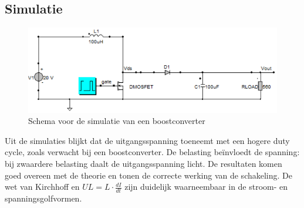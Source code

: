 \subsection{Simulatie}
\begin{figure}[h!]
    \centering
    \includegraphics[width=1\linewidth]{img/hfd1/Schema voor de simulatie van een boostconverter.png}
    \caption{Schema voor de simulatie van een boostconverter}
    \label{fig:Schema voor de simulatie van een boostconverter}
\end{figure}
\begin{table}[ht]
\centering
{}
\caption{Uitgangsspanningen Vuit bij verschillende belasting en duty cycles}
\end{table}
Uit de simulaties blijkt dat de uitgangsspanning toeneemt met een hogere duty cycle, zoals verwacht bij een boostconverter. De belasting beïnvloedt de spanning: bij zwaardere belasting daalt de uitgangsspanning licht. De resultaten komen goed overeen met de theorie en tonen de correcte werking van de schakeling. De wet van Kirchhoff en \(UL = L \cdot \frac{dI}{dt}\) zijn duidelijk waarneembaar in de stroom- en spanningsgolfvormen.

